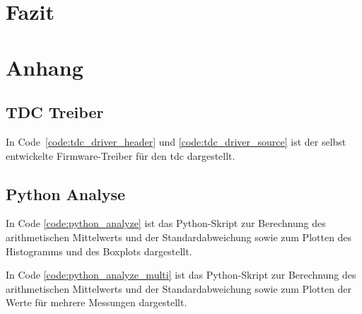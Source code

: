 \documentclass[11pt,a4paper,hidelinks]{article}
\begin{document}
\pagebreak

\section{Fazit}

\pagebreak

\section{Anhang}

\subsection{TDC Treiber}\label{sec:tdc_driver}

In Code~\ref{code:tdc_driver_header} und \ref{code:tdc_driver_source} ist der selbst entwickelte Firmware-Treiber für
den \acrshort{tdc} dargestellt.




\subsection{Python Analyse}\label{sec:python_analyze}

In Code \ref{code:python_analyze} ist das Python-Skript zur Berechnung des arithmetischen Mittelwerts und der
Standardabweichung sowie zum Plotten des Histogramms und des Boxplots dargestellt.



In Code \ref{code:python_analyze_multi} ist das Python-Skript zur Berechnung des arithmetischen Mittelwerts und der
Standardabweichung sowie zum Plotten der Werte für mehrere Messungen dargestellt.





\end{document}
